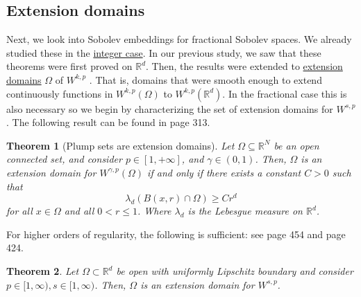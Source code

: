 \documentclass[
    a4paper,
    DIV=14,
    abstract=true,
    numbers=noenddot
]
{scrartcl}
\newtheorem{theorem}{Theorem}[section]
\theoremstyle{definition}
\newcommand{\R}{\mathbb{R}}
\begin{document}
\subsection{Extension domains}\label{extension domains}
Next, we look into Sobolev embeddings for fractional Sobolev spaces. We already studied these in the \href{https://nowheredifferentiable.com/2023-07-12-PDEs-3-Sobolev_spaces/#:~:text=Sobolev%20embeddings-,and%20inequalities,-Sobolev%20inequalities%20are}{integer case}. In our previous study, we saw that these theorems were first proved on $\R^d$. Then, the results were extended to \href{https://nowheredifferentiable.com/2023-07-12-PDEs-3-Sobolev_spaces/#global:~:text=there%20exists%20a-,continuous,-operator}{extension domains} $\Omega $ of $W^{k,p}$ . That is, domains that were smooth enough to extend continuously functions in $W^{k,p}(\Omega )$  to $W^{k,p}(\R^d)$. In the fractional case this is also necessary so we begin by characterizing the set of extension domains for $W^{s,p}$ . The following result can be found in \cite{leoni2017first} page 313.
\begin{theorem}[Plump sets are extension domains]\label{plump sets}
  Let $\Omega \subseteq \mathbb{R}^N$ be an open connected set, and consider $p\in [1,+\infty]$, and $\gamma\in (0,1)$. Then, $\Omega$ is an extension domain for $W^{\gamma, p}(\Omega)$ if and only if there exists a constant $C>0$ such that
  $$
    \lambda_d(B(x, r) \cap \Omega) \geq C r^d
  $$
  for all $x \in \Omega$ and all $0<r \leq 1$. Where $\lambda_d$ is the Lebesgue measure on $\R^d$.
\end{theorem}
For higher orders of regularity, the following is sufficient: see \cite{leoni2023first} page 454 and \cite{leoni2017first} page 424.
\begin{theorem}
  Let $\Omega \subset \R^d$ be open with uniformly Lipschitz boundary and consider   $p\in [1,\infty), s\in[1,\infty)$. Then, $\Omega $ is an extension domain for $W^{s,p}$.
\end{theorem}
\end{document}
